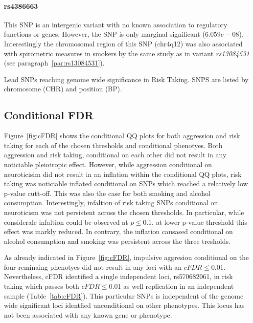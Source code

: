 \paragraph{rs4386663}
\label{par:rs4386663}
This SNP is an intergenic variant with no known association to regulatory functions or genes.
However, the SNP is only marginal significant ($6.059e-08$).
Interestingly the chromosomal region of this SNP (chr4q12) was also associated with spirometric measures in smokers by the same study as in variant \textit{rs13084531} (see paragraph~\ref{par:rs13084531}).

\begin{table}
	\small
	\centering
	
  \caption{
    Lead SNPs reaching genome wide significance in Risk Taking.
    SNPS are listed by chromosome (CHR) and position (BP).
  }\label{tab:lead_snps_risk}
\end{table}

\subsection{Conditional FDR}
\label{sub:conditional_fdr}

Figure~\ref{fig:cFDR} shows the conditional QQ plots for both aggression and risk taking for each of the chosen thresholds and conditional phenotyes.
Both aggression and risk taking, conditional on each other did not result in any noticiable pleiotropic effect.
However, while aggression conditional on neuroticisim did not result in an inflation within the conditional QQ plots, risk taking was noticiable inflated conditional on SNPs which reached a relatively low p-value cutt-off.
This was also the case for both smoking and alcohol consumption.
Interestingly, infaltion of risk taking SNPs conditional on neuroticism was not persistent across the chosen thresholds.
In particular, while considerale infaltion could be observed at $p\leq0.1$, at lower p-value threshold this effect was markly reduced.
In contrary, the inflation causased conditional on alcohol consumption and smoking was persistent across the three tresholds.

As already indicated in Figure~\ref{fig:cFDR}, impulsive aggresion conditional on the four reminaing phenotyes did not result in any loci with an $cFDR\leq0.01$.
Nevertheless, cFDR identified a single independent loci, rs570682061, in risk taking which passes both $cFDR\leq0.01$ as well replication in an independent sample (Table~\ref{tab:cFDR}).
This particular SNPs is independent of the genome wide significant loci identfied unconditional on other phenotypes.
This locus has not been associated with any known gene or phenotype.

